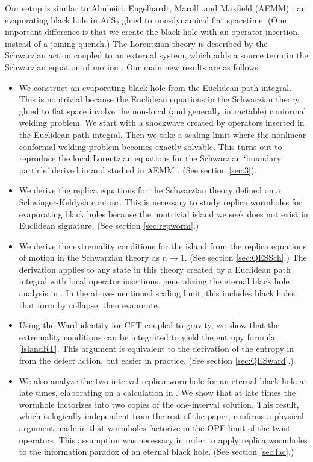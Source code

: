 \documentclass[12pt]{article}
\numberwithin{equation}{section}
\begin{document}
\begin{spacing}{1.1}
Our setup is similar to Almheiri, Engelhardt, Marolf, and Maxfield (AEMM) \cite{Almheiri:2019psf}: an evaporating black hole in AdS$_2$ glued to non-dynamical flat spacetime. (One important difference is that we create the black hole with an operator insertion, instead of a joining quench.) The Lorentzian theory is described by the Schwarzian action coupled to an external system, which adds a source term in the Schwarzian equation of motion \cite{Maldacena:2016upp,Engelsoy:2016xyb,Jensen:2016pah}. Our main new results are as follows:
\begin{itemize}
\item We construct an evaporating black hole from the Euclidean path integral. This is nontrivial because the Euclidean equations in the Schwarzian theory glued to flat space involve the non-local (and generally intractable) conformal welding problem. We start with a shockwave created by operators inserted in the Euclidean path integral. Then we take a scaling limit where the nonlinear conformal welding problem becomes exactly solvable. This turns out to reproduce the local Lorentzian equations for the Schwarzian `boundary particle' derived in \cite{Maldacena:2016upp,Engelsoy:2016xyb} and studied in AEMM \cite{Almheiri:2019psf}. (See section \ref{sec:3}).
\item We derive the replica equations for the Schwarzian theory defined on a Schwinger-Keldysh contour. This is necessary to study replica wormholes for evaporating black holes because the nontrivial island we seek does not exist in Euclidean signature.  (See section \ref{sec:repworm}.)
\item We derive the extremality conditions for the island from the replica equations of motion in the Schwarzian theory as $n \to 1$. (See section \ref{sec:QESSch}.) The derivation applies to any state in this theory created by a Euclidean path integral with local operator insertions, generalizing the eternal black hole analysis in \cite{Almheiri:2019qdq}. In the above-mentioned scaling limit, this includes black holes that form by collapse, then evaporate.
\item Using the Ward identity for CFT coupled to gravity, we show that the extremality conditions can be integrated to yield the entropy formula \eqref{islandRT}. This argument is equivalent to the derivation of the entropy in \cite{Almheiri:2019qdq,Penington:2019kki} from the defect action, but easier in practice. (See section \ref{sec:QESward}.)
\item We also analyze the two-interval replica wormhole for an eternal black hole at late times, elaborating on a calculation in \cite{Almheiri:2019qdq}. We show that at late times the wormhole factorizes into two copies of the one-interval solution. This result, which is logically independent from the rest of the paper, confirms a physical argument made in \cite{Almheiri:2019qdq} that wormholes factorize in the OPE limit of the twist operators. This assumption was necessary in order to apply replica wormholes to the information paradox of an eternal black hole. (See section \ref{sec:fac}.)

\end{itemize}
\end{spacing}
\end{document}
